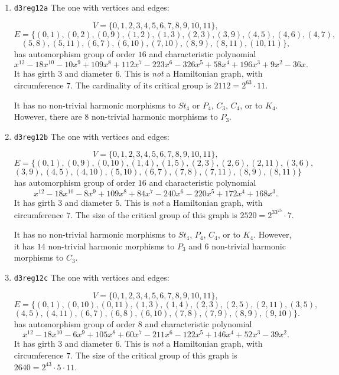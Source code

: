 \documentclass[12pt,letterpaper]{article}
\theoremstyle{definition}
\begin{document}
\begin{enumerate}
\item
  {\tt d3reg12a}\newline %
  The one with vertices and edges:

\[
V=\{ 0,1,2,3,4,5,6,7,8,9,10,11\},
\]
\[
E = \{
(0, 1), (0, 2), (0, 9), (1, 2), (1, 3), (2, 3), (3, 9), (4, 5), (4, 6), (4, 7),
\]
\[
 (5, 8), (5, 11), (6, 7), (6, 10), (7, 10), (8, 9), (8, 11), (10, 11)
\},
\]
has automorphism group of order $16$ and
characteristic polynomial  
\[
x^{12} - 18x^{10} - 10x^9 + 109x^8 + 112x^7 - 223x^6 - 326x^5 + 58x^4 + 196x^3 + 9x^2 - 36x.
\]
It has girth $3$ and diameter $6$.
This is {\it not} a Hamiltonian graph, with circumference $7$.
The cardinality of its critical group is $2112=2^63\cdot 11$.

It has no non-trivial harmonic morphisms to $St_4$ or $P_4$, $C_3$, $C_4$,
or to $K_4$.
However, there are $8$ non-trivial harmonic morphisms to $P_3$.



\item
  {\tt d3reg12b}\newline %
The one with vertices and edges:

\[
V=\{ 0,1,2,3,4,5,6,7,8,9,10,11\},
\]
\[
E = \{
(0, 1), (0, 9), (0, 10), (1, 4), (1, 5), (2, 3), (2, 6), (2, 11), (3, 6), 
\]
\[
(3, 9), (4, 5), (4, 10), (5, 10), (6, 7), (7, 8), (7, 11), (8, 9), (8, 11)
\}
\]
has automorphism group of order $16$ and
characteristic polynomial  
\[
x^{12} - 18x^{10} - 8x^9 + 109x^8 + 84x^7 - 240x^6 - 220x^5 + 172x^4 + 168x^3 .
\]
It has girth $3$ and diameter $5$.
This is {\it not} a Hamiltonian graph, with circumference $7$.
The size of the critical group of this graph is $2520=2^33^25\cdot 7$.

It has no non-trivial harmonic morphisms to $St_4$, $P_4$, $C_4$, or to $K_4$.
However, it has $14$ non-trivial harmonic morphisms to $P_3$ and
$6$ non-trivial harmonic morphisms to $C_3$.

\item
  {\tt d3reg12c}\newline %
  The one with vertices and edges:

\[
V=\{ 0,1,2,3,4,5,6,7,8,9,10,11\},
\]
\[
E = \{
(0, 1), (0, 10), (0, 11), (1, 3), (1, 4), (2, 3), (2, 5), (2, 11), (3, 5),
\]
\[
(4, 5), (4, 11), (6, 7), (6, 8), (6, 10), (7, 8), (7, 9), (8, 9), (9, 10)
\}.
\]
has automorphism group of order $8$ and
characteristic polynomial  
\[
x^{12} - 18x^{10} - 6x^9 + 105x^8 + 60x^7 - 211x^6 - 122x^5 + 146x^4 + 52x^3 - 39x^2 .
\]
It has girth $3$ and diameter $6$.
This is {\it not} a Hamiltonian graph, with circumference $7$.
The size of the critical group of this graph is $2640=2^43\cdot 5\cdot 11$.


\end{enumerate}
\end{document}
